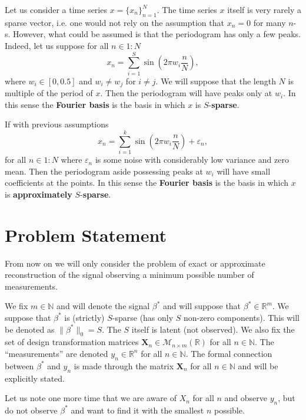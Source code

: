 \documentclass[11pt]{article}
\numberwithin{equation}{section}
\theoremstyle{definition}
\begin{document}
Let us consider a time series $x = \{x_n\}_{n=1}^N$.
The time series $x$ itself is very rarely a sparse vector, i.e. one would not rely on the assumption that $x_n = 0$ for many $n$-s.
However, what could be assumed is that the periodogram has only a few peaks.
Indeed, let us suppose for all $n \in 1:N$
$$ x_n = \sum_{i=1}^S \sin\left(2 \pi w_i \frac{n}{N}\right), $$
where $w_i \in [0, 0.5]$ and $w_i \neq w_j$ for $i \neq j$.
We will suppose that the length $N$ is multiple of the period of $x$.
Then the periodogram will have peaks only at $w_i$.
In this sense the \textbf{Fourier basis} is the basis in which $x$ is $S$-\textbf{sparse}.

If with previous assumptions 
$$ x_n = \sum_{i=1}^k \sin\left(2 \pi w_i \frac{n}{N}\right) + \varepsilon_n, $$
for all $n \in 1:N$
where $\varepsilon_n$ is some noise with considerably low variance and zero mean.
Then the periodogram aside possessing peaks at $w_i$ will have small coefficients at the points.
In this sense the \textbf{Fourier basis} is the basis in which $x$ is \textbf{approximately} $S$-\textbf{sparse}.

\section{Problem Statement}
From now on we will only consider the problem of exact or approximate reconstruction of the signal observing a minimum possible number of measurements.

We fix $m \in \mathbb N$ and will denote the signal $\beta^*$ and will suppose that $\beta^* \in \mathbb R^m$.
We suppose that $\beta^*$ is (strictly) $S$-sparse (has only $S$ non-zero components).
This will be denoted as $\|\beta^*\|_0 = S$.
The $S$ itself is latent (not observed).
We also fix the set of design transformation matrices $\mathbf X_n \in \mathcal M_{n \times m}(\mathbb R)$ for all $n \in \mathbb N$.
The ``measurements'' are denoted $y_n \in \mathbb R^n$ for all $n \in \mathbb N$.
The formal connection between $\beta^*$ and $y_n$ is made through the matrix $\mathbf X_n$ for all $n \in \mathbb N$ and will be explicitly stated.

Let us note one more time that we are aware of $X_n$ for all $n$ and observe $y_n$, but do not observe $\beta^*$ and want to find it with the smallest $n$ possible.
\end{document}
